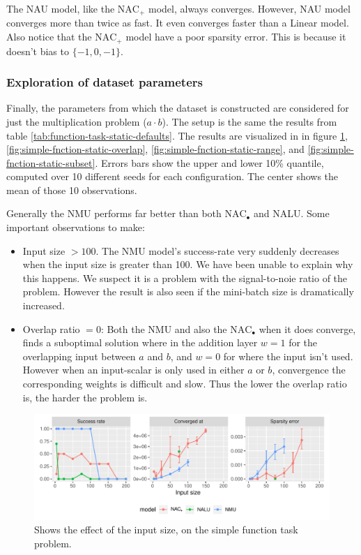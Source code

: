 The NAU model, like the $\mathrm{NAC}_{+}$ model, always converges. However, NAU model converges more than twice as fast. It even converges faster than a Linear model. Also notice that the $\mathrm{NAC}_{+}$ model have a poor sparsity error. This is because it doesn't bias to $\{-1, 0, -1\}$.



\subsubsection{Exploration of dataset parameters}

Finally, the parameters from which the dataset is constructed are considered for just the multiplication problem ($a \cdot b$). The setup is the same the results from table \ref{tab:function-task-static-defaults}. The results are visualized in in figure \ref{fig:simple-fnction-static-input-size}, \ref{fig:simple-fnction-static-overlap}, \ref{fig:simple-fnction-static-range}, and \ref{fig:simple-fnction-static-subset}. Errors bars show the upper and lower 10\% quantile, computed over 10 different seeds for each configuration. The center shows the mean of those 10 observations.

Generally the NMU performs far better than both $\mathrm{NAC}_{\bullet}$ and NALU. Some important observations to make:

\begin{itemize}
\item Input size $> 100$. The NMU model's success-rate very suddenly decreases when the input size is greater than 100. We have been unable to explain why this happens. We suspect it is a problem with the signal-to-noie ratio of the problem. However the result is also seen if the mini-batch size is dramatically increased.
\item Overlap ratio $= 0$: Both the NMU and also the $\mathrm{NAC}_{\bullet}$ when it does converge, finds a suboptimal solution where in the addition layer $w=1$ for the overlapping input between $a$ and $b$, and $w = 0$ for where the input isn't used. However when an input-scalar is only used in either $a$ or $b$, convergence the corresponding weights is difficult and slow. Thus the lower the overlap ratio is, the harder the problem is.
\end{itemize}

\begin{figure}[H]
\centering
\includegraphics[width=\linewidth]{results/simple_function_static_input_size.pdf}
\caption{Shows the effect of the input size, on the simple function task problem.}
\label{fig:simple-fnction-static-input-size}
\end{figure}

